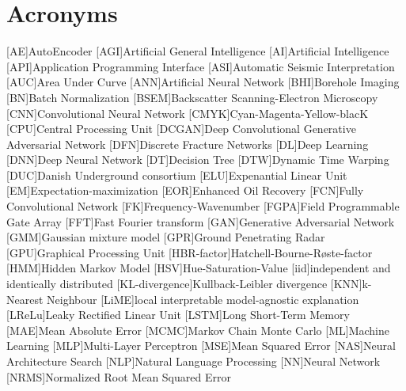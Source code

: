 \chapter{Acronyms}

\begin{acronym}[DCGANS]
[AE]{AutoEncoder}
[AGI]{Artificial General Intelligence}
[AI]{Artificial Intelligence}
[API]{Application Programming Interface}
[ASI]{Automatic Seismic Interpretation}
[AUC]{Area Under Curve}
[ANN]{Artificial Neural Network}
[BHI]{Borehole Imaging}
[BN]{Batch Normalization}
[BSEM]{Backscatter Scanning-Electron Microscopy}
[CNN]{Convolutional Neural Network}
[CMYK]{Cyan-Magenta-Yellow-blacK}
[CPU]{Central Processing Unit}
[DCGAN]{Deep Convolutional Generative Adversarial Network}
[DFN]{Discrete Fracture Networks}
[DL]{Deep Learning}
[DNN]{Deep Neural Network}
[DT]{Decision Tree}
[DTW]{Dynamic Time Warping}
[DUC]{Danish Underground consortium}
[ELU]{Expenantial Linear Unit}
[EM]{Expectation-maximization}
[EOR]{Enhanced Oil Recovery}
[FCN]{Fully Convolutional Network}
[FK]{Frequency-Wavenumber}
[FGPA]{Field Programmable Gate Array}
[FFT]{Fast Fourier transform}
[GAN]{Generative Adversarial Network}
[GMM]{Gaussian mixture model}
[GPR]{Ground Penetrating Radar}
[GPU]{Graphical Processing Unit}
[HBR-factor]{Hatchell-Bourne-R{\o}ste-factor}
[HMM]{Hidden Markov Model} 
[HSV]{Hue-Saturation-Value}
[iid]{independent and identically distributed}
[KL-divergence]{Kullback-Leibler divergence}
[KNN]{k-Nearest Neighbour}
[LiME]{local interpretable model-agnostic explanation}
[LReLu]{Leaky Rectified Linear Unit}
[LSTM]{Long Short-Term Memory}
[MAE]{Mean Absolute Error}
[MCMC]{Markov Chain Monte Carlo}
[ML]{Machine Learning}
[MLP]{Multi-Layer Perceptron}
[MSE]{Mean Squared Error}
[NAS]{Neural Architecture Search}
[NLP]{Natural Language Processing}
[NN]{Neural Network}
[NRMS]{Normalized Root Mean Squared Error}

\end{acronym}

